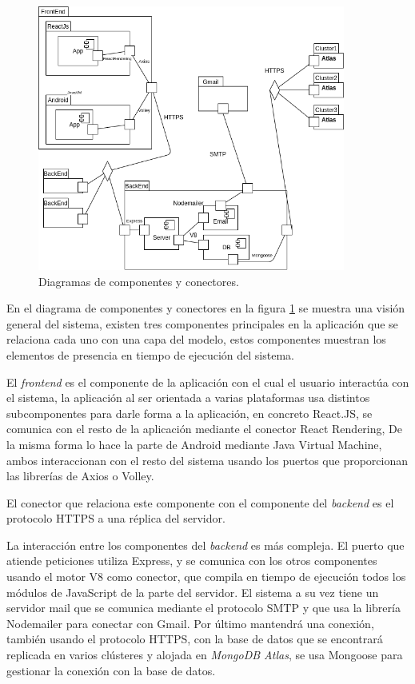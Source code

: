 \documentclass{article}
\begin{document}
\begin{figure}[H]
   \centering
       \includegraphics[width=0.90\textwidth]{../images/cyc.png}
   \caption{Diagramas de componentes y conectores.}
   \label{cyc}
\end{figure}

En el diagrama de componentes y conectores en la figura \ref{cyc} se muestra una visión general del sistema, existen tres componentes principales en la aplicación que se relaciona cada uno con una capa del modelo, estos componentes muestran los elementos de presencia en tiempo de ejecución del sistema.

El \textit{frontend} es el componente de la aplicación con el cual el usuario interactúa con el sistema, la aplicación al ser orientada a varias plataformas usa distintos subcomponentes para darle forma a la aplicación, en concreto React.JS, se comunica con el resto de la aplicación mediante el conector React Rendering, De la misma forma lo hace la parte de Android mediante Java Virtual Machine, ambos interaccionan con el resto del sistema usando los puertos que proporcionan las librerías de Axios o Volley.

El conector que relaciona este componente con el componente del \textit{backend} es el protocolo HTTPS a una réplica del servidor.

La interacción entre los componentes del \textit{backend} es más compleja. El puerto que atiende peticiones utiliza Express, y se comunica con los otros componentes usando el motor V8 como conector, que compila en tiempo de ejecución todos los módulos de JavaScript de la parte del servidor. El sistema a su vez tiene un servidor mail que se comunica mediante el protocolo SMTP y que usa la librería Nodemailer para conectar con Gmail. Por último mantendrá una conexión, también usando el protocolo HTTPS, con la base de datos que se encontrará replicada en varios clústeres y alojada en \textit{MongoDB Atlas}, se usa Mongoose para gestionar la conexión con la base de datos.
\end{document}
